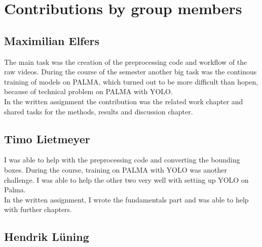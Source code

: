 \chapter{Contributions by group members}
\label{ch:contributions}


\section{Maximilian Elfers}

The main task was the creation of the preprocessing code and workflow of the raw videos. During the course of the semester another big task was the continous training of models on PALMA, which turned out to be more difficult than hopen, because of technical problem on PALMA with YOLO. \\
In the written assignment the contribution was the related work chapter and shared tasks for the methods, results and discussion chapter.

\section{Timo Lietmeyer}
I was able to help with the preprocessing code and converting the bounding boxes. During the course, training on PALMA with YOLO was another challenge. I was able to help the other two very well with setting up YOLO on Palma. \\ In the written assignment, I wrote the fundamentals part and was able to help with further chapters.

\section{Hendrik Lüning}

